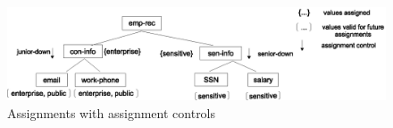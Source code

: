  
 	\begin{figure} [t]
 		\centering
 		\includegraphics[width=1\textwidth]{NSS16/propagation-option}
 		\caption{Assignments with assignment controls}
 		\label{fig:propagation-option}
 	\end{figure}
